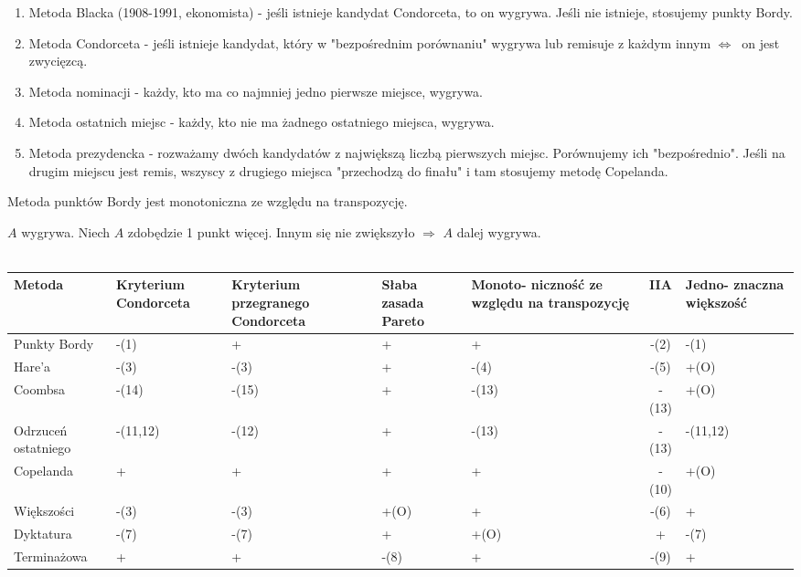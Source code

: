 \documentclass[12pt,a4paper]{article}
\theoremstyle{break}
\newcommand{\witw}{$\Leftrightarrow$}
\begin{document}
		\begin{enumerate}[1.]
			\item Metoda Blacka (1908-1991, ekonomista) - jeśli istnieje kandydat Condorceta, to on wygrywa. Jeśli nie istnieje, stosujemy punkty Bordy.
			\item Metoda Condorceta - jeśli istnieje kandydat, który w "bezpośrednim porównaniu" wygrywa lub remisuje z każdym innym \witw$\:$  on jest zwycięzcą.
			\item Metoda nominacji - każdy, kto ma co najmniej jedno pierwsze miejsce, wygrywa.
			\item Metoda ostatnich miejsc - każdy, kto nie ma żadnego ostatniego miejsca, wygrywa.
			\item Metoda prezydencka - rozważamy dwóch kandydatów z największą liczbą pierwszych miejsc. Porównujemy ich "bezpośrednio". Jeśli na drugim miejscu jest remis, wszyscy z drugiego miejsca "przechodzą do finału" i tam stosujemy metodę Copelanda.
		\end{enumerate}
		
		Metoda punktów Bordy jest monotoniczna ze względu na transpozycję.
		
		$A$ wygrywa. Niech $A$ zdobędzie 1 punkt więcej. Innym się nie zwiększyło $\Rightarrow$ $A$ dalej wygrywa.\\\\
		
		\begin{tabular}{|p{2.5cm}|p{2cm}|p{2cm}|p{2cm}|p{2cm}|c|p{2cm}|}\hline
			Metoda & Kryterium Condorceta & Kryterium przegranego Condorceta & Słaba zasada Pareto & Monoto- niczność ze względu na transpozycję & IIA & Jedno- znaczna większość\\\hline
			Punkty Bordy   &-(1)&+&+&+&-(2)&-(1)\\\hline
			Hare'a   &-(3)&-(3)&+&-(4)&-(5)&+(O)\\\hline
			Coombsa &-(14)&-(15)&+&-(13)&-(13)&+(O)\\\hline
			Odrzuceń ostatniego &-(11,12)&-(12)&+&-(13)&-(13)&-(11,12)\\\hline
			Copelanda &+&+&+&+&-(10)&+(O)\\\hline
			Większości &-(3)&-(3)&+(O)&+&-(6)&+\\\hline
			Dyktatura &-(7)&-(7)&+&+(O)&+&-(7)\\\hline
			Terminażowa &+&+&-(8)&+&-(9)&+\\\hline
		\end{tabular}\\\\
		
\end{document}

